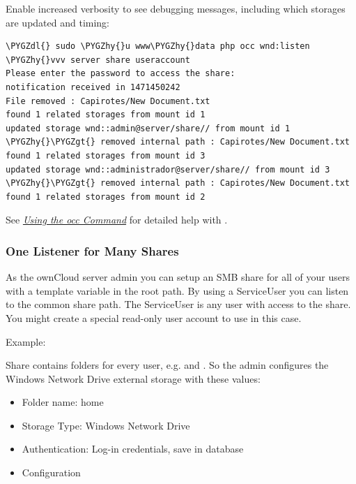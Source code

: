 \documentclass[letterpaper,10pt,english]{sphinxmanual}
\def\PYGZgt{\char`\>}
\def\PYGZdl{\char`\$}
\def\PYGZhy{\char`\-}
\begin{document}
Enable increased verbosity to see debugging messages, including which storages are updated and timing:

\begin{Verbatim}[commandchars=\\\{\}]
\PYGZdl{} sudo \PYGZhy{}u www\PYGZhy{}data php occ wnd:listen \PYGZhy{}vvv server share useraccount
Please enter the password to access the share:
notification received in 1471450242
File removed : Capirotes/New Document.txt
found 1 related storages from mount id 1
updated storage wnd::admin@server/share// from mount id 1 \PYGZhy{}\PYGZgt{} removed internal path : Capirotes/New Document.txt
found 1 related storages from mount id 3
updated storage wnd::administrador@server/share// from mount id 3 \PYGZhy{}\PYGZgt{} removed internal path : Capirotes/New Document.txt
found 1 related storages from mount id 2
\end{Verbatim}

See {\hyperref[configuration_server/occ_command::doc]{\emph{Using the occ Command}}} for detailed help with .


\subsubsection{One Listener for Many Shares}
\label{enterprise_external_storage/windows-network-drive_configuration:one-listener-for-many-shares}
As the ownCloud server admin you can setup an SMB share for all of your users with a 
template variable in the root path. By using a ServiceUser you can listen to the common share path. The ServiceUser is any user with access to the share. You might create a special read-only user account to use in this case.

Example:

Share  contains folders for every user, e.g. 
and . So the admin configures the Windows Network Drive external storage with these values:
\begin{itemize}
\item {} 
Folder name: home

\item {} 
Storage Type: Windows Network Drive

\item {} 
Authentication: Log-in credentials, save in database

\item {} 
Configuration

\end{itemize}
\end{document}
